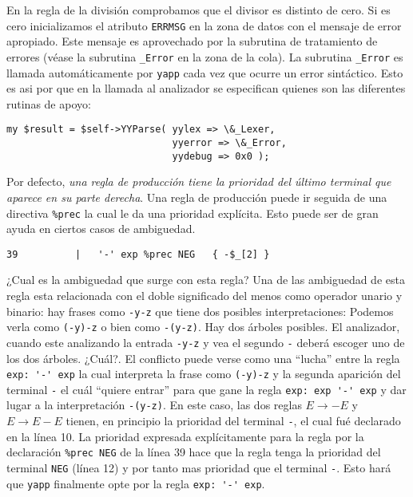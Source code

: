 En la regla de la división comprobamos que el divisor es 
distinto de cero. Si es cero inicializamos el atributo 
\verb|ERRMSG| en la zona de datos con el mensaje de
error apropiado. Este mensaje es aprovechado por la subrutina
de tratamiento de errores (véase la subrutina \verb|_Error|
en la zona de la cola). La subrutina \verb|_Error| es llamada
automáticamente por \verb|yapp| cada vez que ocurre un error
sintáctico. Esto es asi por que en la llamada 
al analizador se especifican quienes son las diferentes
rutinas de apoyo:

\begin{verbatim}
my $result = $self->YYParse( yylex => \&_Lexer, 
                             yyerror => \&_Error,
                             yydebug => 0x0 );
\end{verbatim}

Por defecto, \emph{una regla de producción
tiene la prioridad del último terminal que aparece
en su parte derecha}.
Una regla de producción puede ir seguida de una directiva
\verb|%prec| la cual le da una prioridad explícita.  
Esto puede ser de gran ayuda en ciertos casos de 
ambiguedad.

\begin{verbatim}
39          |   '-' exp %prec NEG   { -$_[2] }
\end{verbatim}
¿Cual es la ambiguedad que surge con esta regla? 
Una de las ambiguedad de esta regla 
esta relacionada con el doble significado
del menos como operador unario y binario: hay frases
como \verb|-y-z| que tiene dos posibles interpretaciones:
Podemos verla como \verb|(-y)-z| o bien como \verb|-(y-z)|.
Hay dos árboles posibles. El analizador, cuando este analizando
la entrada \verb|-y-z| y vea el
segundo \verb|-| deberá escoger uno de los dos árboles. 
¿Cuál?. El conflicto puede verse como una ``lucha'' entre
la regla \verb|exp: '-' exp| la cual interpreta la frase como
\verb|(-y)-z| y la segunda aparición del terminal \verb|-| 
el cuál ``quiere entrar'' para que gane la regla \verb|exp: exp '-' exp|
y dar lugar a la interpretación \verb|-(y-z)|.
En este caso, las dos reglas 
$E \rightarrow - E$ y $E \rightarrow E - E$ tienen, en principio
la prioridad del terminal \verb|-|, el cual fué declarado en la
línea 10.
La prioridad expresada explícitamente
para la regla por la declaración \verb|%prec NEG| de la línea
39 hace que la regla tenga la prioridad
del terminal \verb|NEG| (línea 12) y por tanto mas prioridad
que el terminal \verb|-|. Esto hará que \verb|yapp| finalmente opte
por la regla \verb|exp: '-' exp|.

